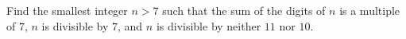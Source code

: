 Find the smallest integer $n>7$ such that the sum of the digits of $n$ is a multiple of $7$, $n$ is divisible by $7$, and $n$ is divisible by neither $11$ nor $10$.
